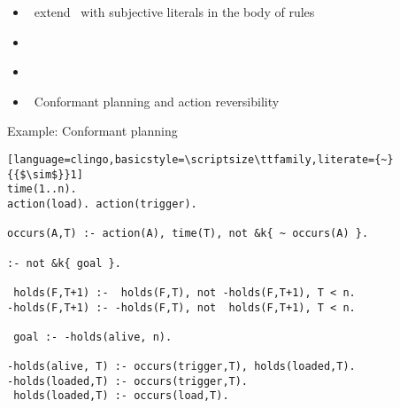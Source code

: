 \begin{frame}{\eclingo}
  \begin{itemize}
  \item {} \ extend \clingo\ with subjective literals in the body of rules
  \item {} \
  \item {} \ \cite{cafagarosc20a}
  \item {} \ Conformant planning \cite{cafafa21a} and action reversibility \cite{famoch21a}
  \end{itemize}
\end{frame}
\begin{frame}[fragile]{Example: Conformant planning}
\begin{lstlisting}[language=clingo,basicstyle=\scriptsize\ttfamily,literate={~}{{$\sim$}}1]
time(1..n).
action(load). action(trigger).

occurs(A,T) :- action(A), time(T), not &k{ ~ occurs(A) }.

:- not &k{ goal }.

 holds(F,T+1) :-  holds(F,T), not -holds(F,T+1), T < n.
-holds(F,T+1) :- -holds(F,T), not  holds(F,T+1), T < n.

 goal :- -holds(alive, n).

-holds(alive, T) :- occurs(trigger,T), holds(loaded,T).
-holds(loaded,T) :- occurs(trigger,T).
 holds(loaded,T) :- occurs(load,T).
\end{lstlisting}
\end{frame}
%
